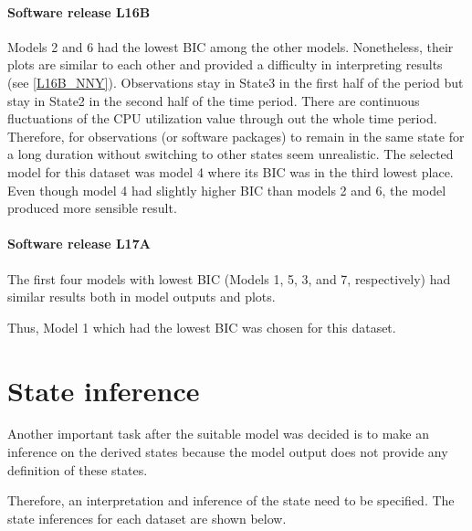 \paragraph*{Software release L16B}

Models 2 and 6 had the lowest BIC among the other models. Nonetheless,
their plots are similar to each other and provided a difficulty in
interpreting results (see \ref{L16B_NNY}). Observations stay in State3
in the first half of the period but stay in State2 in the second half
of the time period. There are continuous fluctuations of the CPU utilization
value through out the whole time period. Therefore, for observations
(or software packages) to remain in the same state for a long duration
without switching to other states seem unrealistic. The selected model
for this dataset was model 4 where its BIC was in the third lowest
place. Even though model 4 had slightly higher BIC than models 2 and
6, the model produced more sensible result.

\paragraph*{Software release L17A}

\begin{comment}
Model 1 appeared to have a good model output and plot when comparing
with the rest of the models. 
\end{comment}
The first four models with lowest BIC (Models 1, 5, 3, and 7, respectively)
had similar results both in model outputs and plots.%
\begin{comment}
explanation when examining its plot.
\end{comment}
{} Thus, Model 1 which had the lowest BIC was chosen for this dataset.

\section{State inference}

Another important task after the suitable model was decided is to
make an inference on the derived states because the model output does
not provide any definition of these states. %
\begin{comment}
A function from the package will estimate coefficients in each state
without providing the definition of these states. 
\end{comment}
Therefore, an interpretation and inference of the state need to be
specified. The state inferences for each dataset are shown below. 


